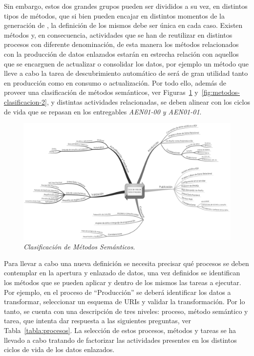 Sin embargo, estos dos grandes grupos pueden ser divididos a su vez, en distintos tipos de métodos, que si bien
pueden encajar en distintos momentos de la generación de \linkeddata, la definición de los mismos debe ser única en cada caso. Existen
métodos y, en consecuencia, actividades que se han de reutilizar en distintos procesos con diferente denominación, de esta manera 
los métodos relacionados con la producción de datos enlazados estarán en estrecha relación
con aquellos que se encarguen de actualizar o consolidar los datos, por ejemplo un método que lleve
a cabo la tarea de descubrimiento automático de \datasets será de gran utilidad tanto en producción como en consumo o actualización. 
Por todo ello, además de proveer una clasificación de métodos semánticos, ver Figuras~\ref{fig:metodos-clasificacion} y~\ref{fig:metodos-clasificacion-2}, y distintas actividades 
relacionadas, se deben alinear con los ciclos de vida que se repasan en los entregables \textit{AEN01-00 y AEN01-01}.


\begin{figure}[!htb]
\centering
	\includegraphics[width=16cm]{images/phd/ldl}
\caption{\textit{Clasificación de Métodos Semánticos}.}
\label{fig:metodos-clasificacion}
\end{figure}

Para llevar a cabo una nueva definición se necesita precisar qué procesos se deben contemplar en la apertura y enlazado
de datos, una vez definidos se identifican los métodos que se pueden aplicar y dentro de los mismos las tareas a ejecutar. 
Por ejemplo, en el proceso de ``Producción'' se deberá identificar los datos a transformar, seleccionar un esquema de URIs y validar la transformación. 
Por lo tanto, se cuenta con una descripción de tres niveles: proceso, método semántico y tarea, que intenta dar respuesta a las siguientes preguntas, ver Tabla~\ref{tabla:procesos}. La selección
de estos procesos, métodos y tareas se ha llevado a cabo tratando de factorizar las actividades presentes en los distintos ciclos de vida de los datos enlazados.

